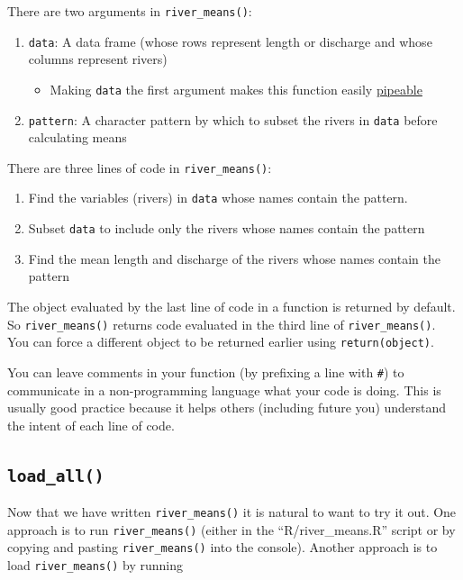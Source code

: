 \documentclass[
]{book}
\providecommand{\tightlist}{%
  \setlength{\itemsep}{0pt}\setlength{\parskip}{0pt}}
\begin{document}
There are two arguments in \texttt{river\_means()}:

\begin{enumerate}
\def\labelenumi{\arabic{enumi}.}
\tightlist
\item
  \texttt{data}: A data frame (whose rows represent length or discharge and whose columns represent rivers)

  \begin{itemize}
  \tightlist
  \item
    Making \texttt{data} the first argument makes this function easily \href{https://r4ds.had.co.nz/pipes.html}{pipeable}
  \end{itemize}
\item
  \texttt{pattern}: A character pattern by which to subset the rivers in \texttt{data} before calculating means
\end{enumerate}

There are three lines of code in \texttt{river\_means()}:

\begin{enumerate}
\def\labelenumi{\arabic{enumi}.}
\tightlist
\item
  Find the variables (rivers) in \texttt{data} whose names contain the pattern.
\item
  Subset \texttt{data} to include only the rivers whose names contain the pattern
\item
  Find the mean length and discharge of the rivers whose names contain the pattern
\end{enumerate}

The object evaluated by the last line of code in a function is returned by default. So \texttt{river\_means()} returns code evaluated in the third line of \texttt{river\_means()}. You can force a different object to be returned earlier using \texttt{return(object)}.

You can leave comments in your function (by prefixing a line with \texttt{\#}) to communicate in a non-programming language what your code is doing. This is usually good practice because it helps others (including future you) understand the intent of each line of code.

\hypertarget{load-all}{%
\subsection{\texorpdfstring{\texttt{load\_all()}}{load\_all()}}\label{load-all}}

Now that we have written \texttt{river\_means()} it is natural to want to try it out. One approach is to run \texttt{river\_means()} (either in the ``R/river\_means.R'' script or by copying and pasting \texttt{river\_means()} into the console). Another approach is to load \texttt{river\_means()} by running
\end{document}
